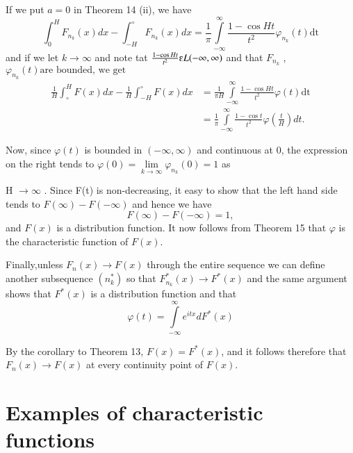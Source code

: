 If we put $a=0$ in Theorem 14 (ii), we have 
$$
\int^H_0 F_{n_k} (x) dx - \int^\circ_{-H} F_{n_k} (x)dx=\frac {1}
    {\pi} \int\limits^\infty_{-\infty} \frac {1-\cos Ht} {t^2} \varphi_{n_k}
    (t) \text{dt} 
$$
and if we let $k \rightarrow \infty$  and note tat  $\frac{1-\cos Ht}
{t^2}   \varepsilonup  L (- \infty, \infty) $ and that  $ F_{n_k}$ ,
$\varphi_{n_k}(t) \text {are bounded, we get} $  
\begin{align*}
  \frac {1} {H}  \int^H_\circ F(x)dx-\frac{1} {H} \int^{\circ}_{-H}
  F(x)dx & = \frac{1} {\pi H} \int\limits^\infty_{-\infty} \frac {1-\cos Ht} {t^2}
  \varphi (t) \text {dt}\\ 
  & = \frac{ 1} {\pi} \int\limits^\infty_{-\infty}  \frac {1-\cos t} {t^2}
  \varphi  (\frac{t}{H})  dt.
\end{align*}

Now, since $\varphi (t)$ is bounded in $(- \infty, \infty)$ and
continuous at 0, the expression on the right tends to $\varphi (0)=
\lim\limits_{k \rightarrow \infty} \varphi_{n_k} (0)=1$ as 

H $\rightarrow \infty $ . Since F(t) is non-decreasing, it easy to
show that the left hand side tends to $F (\infty)- F(-\infty)$ and
hence we have
$$
F(\infty)-F (-\infty)=1,
$$
and $F(x)$ is a distribution function. It now follows from Theorem 15
that $\varphi$ is the  characteristic function of $F(x)$.

Finally,\pageoriginale unless $F_n(x)\rightarrow F(x)$ through the entire sequence
we can define another subsequence $(n^*_k)$ so that $F^*_{n_k} (x)
\rightarrow F^* (x)$ and the same argument shows that $F^* (x)$ is a
distribution function and that 
$$
\varphi (t)= \int\limits^\infty_{-\infty} e^{itx}  dF^* (x)
$$

By the corollary to Theorem 13, $F(x)=F^* (x)$, and it follows
therefore that $F_n (x)\rightarrow F(x)$ at every continuity point of
$F(x)$. 

\section{Examples of characteristic functions}\label{chap2:sec7} 

